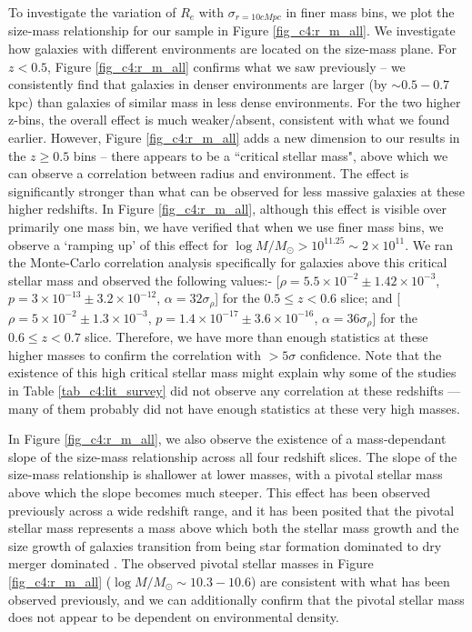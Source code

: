 To investigate the variation of $R_e$ with $\sigma_{r=10cMpc}$ in finer mass bins, we plot the size-mass relationship for our sample in Figure \ref{fig_c4:r_m_all}. We investigate how galaxies with different environments are located on the size-mass plane. 
For $z < 0.5$, Figure \ref{fig_c4:r_m_all} confirms what we saw previously -- we consistently find that galaxies in denser environments are larger (by $\sim 0.5-0.7$ kpc) than galaxies of similar mass in less dense environments. For the two higher z-bins, the overall effect is much weaker/absent, consistent with what we found earlier. However, Figure \ref{fig_c4:r_m_all} adds a new dimension to our results in the $z \geq 0.5$ bins -- there appears to be a ``critical stellar mass", above which we can observe a correlation between radius and environment. The effect is significantly stronger than what can be observed for less massive galaxies at these higher redshifts. In Figure \ref{fig_c4:r_m_all}, although this effect is visible over primarily one mass bin, we have verified that when we use finer mass bins, we observe a `ramping up' of this effect for $\log M/M_{\odot} > 10^{11.25} \sim 2\times10^{11}$. We ran the Monte-Carlo correlation analysis specifically for galaxies above this critical stellar mass and observed the following values:- [$\rho = 5.5\times10^{-2} \pm 1.42\times10^{-3}$, $p = 3\times10^{-13} \pm 3.2\times10^{-12}$, $\alpha=32\sigma_{\rho}$] for the $0.5 \leq z < 0.6$ slice; and [$\rho = 5\times10^{-2} \pm 1.3\times10^{-3}$, $p = 1.4\times10^{-17} \pm 3.6\times10^{-16}$, $\alpha=36\sigma_{\rho}$] for the $0.6 \leq z < 0.7$ slice. Therefore, we have more than enough statistics at these higher masses to confirm the correlation with $>5\sigma$ confidence. Note that the existence of this high critical stellar mass might explain why some of the studies in Table \ref{tab_c4:lit_survey} did not observe any correlation at these redshifts --- many of them probably did not have enough statistics at these very high masses. 

In Figure \ref{fig_c4:r_m_all}, we also observe the existence of a mass-dependant slope of the size-mass relationship across all four redshift slices. The slope of the size-mass relationship is shallower at lower masses, with a pivotal stellar mass above which the slope becomes much steeper. This effect has been observed previously across a wide redshift range, and it has been posited that the pivotal stellar mass represents a mass above which both the stellar mass growth and the size growth of galaxies transition from being star formation dominated to dry merger dominated \citep[e.g.,][]{mowla19,hsc_mass_size}. The observed pivotal stellar masses in Figure \ref{fig_c4:r_m_all} ($\log M/M_{\odot} \sim 10.3-10.6$) are consistent with what has been observed previously, and we can additionally confirm that the pivotal stellar mass does not appear to be dependent on environmental density. 


